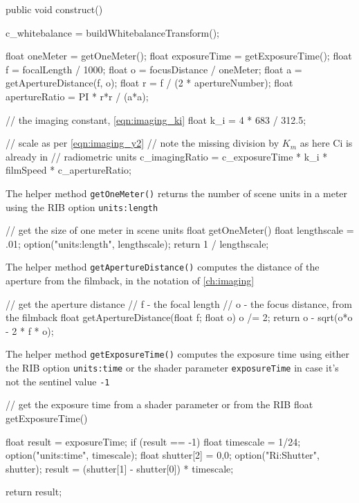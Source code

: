 \begin{rslcode}
public void construct()
{
    c_whitebalance = buildWhitebalanceTransform();

    float oneMeter = getOneMeter();
    float exposureTime = getExposureTime();
    float f = focalLength / 1000;
    float o = focusDistance / oneMeter;
    float a = getApertureDistance(f, o);
    float r = f / (2 * apertureNumber);
    float apertureRatio = PI * r*r / (a*a);

    // the imaging constant, \cref{eqn:imaging_ki}
    float k_i = 4 * 683 / 312.5;

    // scale as per \cref{eqn:imaging_y2}
    // note the missing division by $K_m$ as here Ci is already in
    // radiometric units
    c_imagingRatio = c_exposureTime * k_i * filmSpeed * c_apertureRatio;
}
\end{rslcode}

The helper method \Verb|getOneMeter()| returns the number of scene units in a
meter using the \gls{RIB} option \Verb|units:length|

\begin{rslcode}
// get the size of one meter in scene units
float getOneMeter()
{
    float lengthscale = .01;
    option("units:length", lengthscale);
    return 1 / lengthscale;
}
\end{rslcode}


The helper method \Verb|getApertureDistance()| computes the distance of the
aperture from the filmback, in the notation of \cref{ch:imaging}

\begin{rslcode}
// get the aperture distance
// f - the focal length
// o - the focus distance, from the filmback
float getApertureDistance(float f; float o)
{
    o /= 2;
    return o - sqrt(o*o - 2 * f * o);
}
\end{rslcode}


The helper method \Verb|getExposureTime()| computes the exposure time using
either the \gls{RIB} option \Verb|units:time| or the shader parameter
\Verb|exposureTime| in case it's not the sentinel value \Verb|-1|

\begin{rslcode}
// get the exposure time from a shader parameter or from the RIB
float getExposureTime()
{
    float result = exposureTime;
    if (result == -1)
    {
        float timescale = 1/24;
        option("units:time", timescale);
        float shutter[2] = {0,0};
        option("Ri:Shutter", shutter);
        result = (shutter[1] - shutter[0]) * timescale;
    }

    return result;
}
\end{rslcode}



